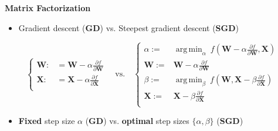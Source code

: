 \documentclass{beamer}
\DeclareMathOperator*{\argmin}{arg\,min}
\begin{document}
\begin{frame}{\color{black}\textbf{Matrix Factorization}}
\begin{itemize}
\item Gradient descent (\textbf{GD}) vs. Steepest gradient descent (\textbf{SGD})
\end{itemize}
\begin{equation*}
\left\{
\begin{aligned}
\boldsymbol{W}:&=\boldsymbol{W}-\alpha\frac{\partial f}{\partial\boldsymbol{W}} \\
\boldsymbol{X}:&=\boldsymbol{X}-\alpha\frac{\partial f}{\partial\boldsymbol{X}} \\
\end{aligned}\right.
\quad\text{vs.}\quad
\left\{
\begin{aligned}
\alpha:=&{\displaystyle\argmin_{\alpha}}~f(\boldsymbol{W}-\alpha \frac{\partial f}{\partial\boldsymbol{W}},\boldsymbol{X}) \\
\boldsymbol{W}:=&\boldsymbol{W}-\alpha \frac{\partial f}{\partial\boldsymbol{W}} \\
\beta:=&{\displaystyle\argmin_{\beta}}~f(\boldsymbol{W},\boldsymbol{X}-\beta \frac{\partial f}{\partial\boldsymbol{X}}) \\
\boldsymbol{X}:=&\boldsymbol{X}-\beta \frac{\partial f}{\partial\boldsymbol{X}} \\
\end{aligned}\right.
\end{equation*}

\begin{itemize}\scriptsize
\item \textbf{Fixed} step size $\alpha$ (\textbf{GD}) vs. \textbf{optimal} step sizes $\{\alpha,\beta\}$ (\textbf{SGD})
\end{itemize}

\end{frame}
\end{document}
